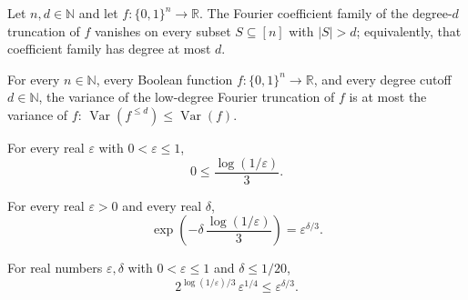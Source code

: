 \begin{lemma}
\label{BooleanAnalysis.GaussianSpace.Invariance.lowDegreePart_polynomial_degree}
\leanok
{}
Let $n,d\in\mathbb N$ and let $f:\{0,1\}^n\to\mathbb R$. The Fourier coefficient family
of the degree-$d$ truncation of $f$ vanishes on every subset $S\subseteq[n]$ with
$|S|>d$; equivalently, that coefficient family has degree at most $d$.
\end{lemma}

\begin{lemma}
\label{BooleanAnalysis.GaussianSpace.Invariance.lowDegreePart_variance_le}
\leanok
{}
For every $n\in\mathbb{N}$, every Boolean function $f:\{0,1\}^n\to\mathbb{R}$, and every
degree cutoff $d\in\mathbb{N}$, the variance of the low-degree Fourier truncation of $f$
is at most the variance of $f$: $\operatorname{Var}(f^{\le d})\leq
\operatorname{Var}(f)$.
\end{lemma}

\begin{lemma}
\label{BooleanAnalysis.GaussianSpace.Invariance.invariance_cutoff_nonneg}
\leanok
{}
For every real $\varepsilon$ with $0<\varepsilon\le1$,
\[
0\le \frac{\log(1/\varepsilon)}{3}.
\]
\end{lemma}

\begin{lemma}
\label{BooleanAnalysis.GaussianSpace.Invariance.invariance_cutoff_exp}
\leanok
{}
For every real $\varepsilon>0$ and every real $\delta$,
\[
\exp\!\left(-\delta\,\frac{\log(1/\varepsilon)}{3}\right)=\varepsilon^{\delta/3}.
\]
\end{lemma}

\begin{lemma}
\label{BooleanAnalysis.GaussianSpace.Invariance.invariance_cutoff_power_le}
\leanok
{}
For real numbers $\varepsilon,\delta$ with $0<\varepsilon\le1$ and $\delta\le1/20$,
\[
2^{\log(1/\varepsilon)/3}\,\varepsilon^{1/4}\le \varepsilon^{\delta/3}.
\]
\end{lemma}

